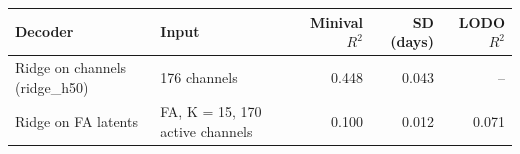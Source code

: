 \begin{tabular}{llrrr}
\toprule
Decoder & Input & Minival $R^2$ & SD (days) & LODO $R^2$ \\
\midrule
Ridge on channels (ridge_h50) & 176 channels & 0.448 & 0.043 & -- \\
Ridge on FA latents & FA, K = 15, 170 active channels & 0.100 & 0.012 & 0.071 \\
\bottomrule
\end{tabular}
